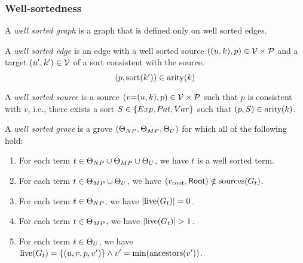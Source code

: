
\subsubsection{Well-sortedness}

\begin{definition}
  A \emph{well sorted graph} is a graph that is defined only on well sorted edges.
\end{definition}

\begin{definition}
  A \emph{well sorted edge} is an edge with a well sorted source $((u, k), p) \in \V \times \P$
  and a target $(u', k') \in \V$ of a sort consistent with the source.
  \[
    \left( p, \sort{k'} \right) \in \arity{k}
  \]
\end{definition}

\begin{definition}
  A \emph{well sorted source} is a source $(v{=}(u, k), p) \in \V \times \P$ such that $p$ is consistent with $v$,
  i.e., there exists a sort $S \in \SetOf{Exp, Pat, Var}$ such that $(p, S) \in \arity{k}$.
\end{definition}

\begin{definition}
  A \emph{well sorted grove} is a grove $(\Set[NP], \Set[MP], \Set[U])$ for which all of the following hold:
  \begin{enumerate}
    \item For each term $t \in \Set[NP] \cup \Set[MP] \cup \Set[U]$, we have $t$ is a well sorted term.
    \item For each term $t \in \Set[MP] \cup \Set[U]$, we have $(\rootVertex, \Root) \notin \sources{G_t}$.
    \item For each term $t \in \Set[NP]$, we have $\SizeOf{\live{G_t}} = 0$.
    \item For each term $t \in \Set[MP]$, we have $\SizeOf{\live{G_t}} > 1$.
    \item For each term $t \in \Set[U]$, we have $\live{G_t} = \SetOf{(u, v, p, v')} \land v' = \min{\ancestors{v'}}$.
  \end{enumerate}
\end{definition}


